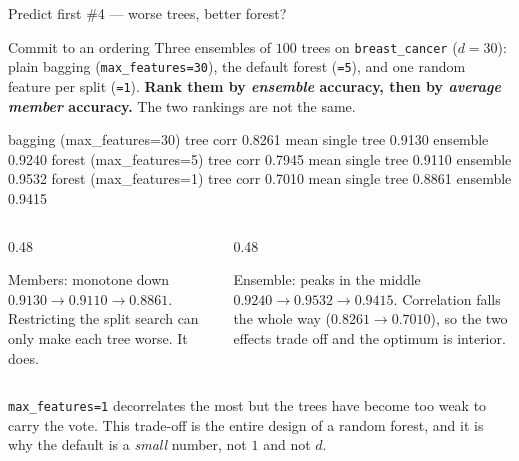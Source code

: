 \documentclass[aspectratio=169]{beamer}
\begin{document}
\begin{frame}[fragile,shrink=10]{Predict first \#4 --- worse trees, better forest?}
  \begin{alertblock}{Commit to an ordering}
    Three ensembles of $100$ trees on \texttt{breast\_cancer} ($d = 30$):
    plain bagging (\texttt{max\_features=30}), the default forest
    (\texttt{=5}), and one random feature per split (\texttt{=1}).
    \textbf{Rank them by \emph{ensemble} accuracy, then by \emph{average
    member} accuracy.} The two rankings are not the same.
  \end{alertblock}
\begin{outblk}
bagging (max_features=30)   tree corr 0.8261   mean single tree 0.9130   ensemble 0.9240
forest  (max_features=5)    tree corr 0.7945   mean single tree 0.9110   ensemble 0.9532
forest  (max_features=1)    tree corr 0.7010   mean single tree 0.8861   ensemble 0.9415
\end{outblk}
  \begin{columns}[T]
    \begin{column}{0.48\textwidth}
      \begin{block}{Members: monotone down}
        $0.9130 \to 0.9110 \to 0.8861$. Restricting the split search can only
        make each tree worse. It does.
      \end{block}
    \end{column}
    \begin{column}{0.48\textwidth}
      \begin{alertblock}{Ensemble: peaks in the middle}
        $0.9240 \to \mathbf{0.9532} \to 0.9415$. Correlation falls the whole
        way ($0.8261 \to 0.7010$), so the two effects trade off and the
        optimum is interior.
      \end{alertblock}
    \end{column}
  \end{columns}
  \begin{center}\small
    \texttt{max\_features=1} decorrelates the most but the trees have become
    too weak to carry the vote. This trade-off is the entire design of a
    random forest, and it is why the default is a \emph{small} number, not $1$
    and not $d$.
  \end{center}
\end{frame}
\end{document}

